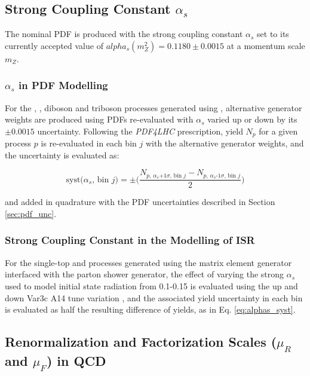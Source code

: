 \subsection{Strong Coupling Constant \(\alpha_s\)}

The nominal PDF is produced with the strong coupling constant \(\alpha_s\) set to its currently accepted value of \(alpha_s(m_Z^2)=0.1180\pm0.0015\) \cite{PDF4LHC_recos_2016} at a momentum scale \(m_Z\). 

\subsubsection{\(\alpha_s\) in PDF Modelling}

For the \wjets, \zjets, diboson and triboson processes generated using \SHERPA, alternative generator weights are produced using PDFs re-evaluated with \(\alpha_s\) varied up or down by its \(\pm0.0015\) uncertainty. Following the \textit{PDF4LHC} prescription, yield \(N_p\) for a given process \(p\) is re-evaluated in each bin \(j\) with the alternative generator weights, and the uncertainty is evaluated as:

\begin{equation}
\label{eq:alphas_syst}
\text{syst}\text{(\(\alpha_s\), bin \(j\))}= \pm\Bigg(\frac{N_\text{\(p\), \(\alpha_s\)+1\(\sigma\), bin \(j\)} - N_\text{\(p\), \(\alpha_s\)-1\(\sigma\), bin \(j\)} }{2}\Bigg)
\end{equation}

\noindent and added in quadrature with the PDF uncertainties described in Section \ref{sec:pdf_unc}.

\subsubsection{Strong Coupling Constant in the Modelling of ISR}

For the single-top and \ttbar processes generated using the \POWHEGBOX matrix element generator interfaced with the  parton shower generator, the effect of varying the strong \(\alpha_s\) used to model initial state radiation from 0.1-0.15 is evaluated using the up and down Var3c A14 tune variation \cite{ATL-PHYS-PUB-2014-021}, and the associated yield uncertainty in each bin is evaluated as half the resulting difference of yields, as in Eq. \ref{eq:alphas_syst}. 

\subsection{Renormalization and Factorization Scales (\(\mu_R\) and \(\mu_F\)) in QCD}

